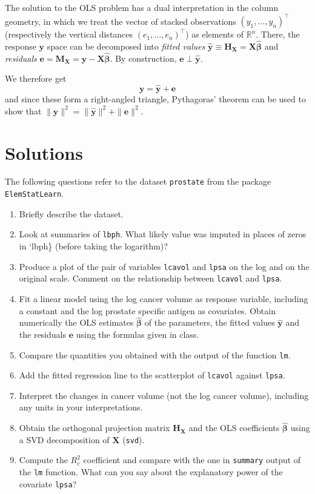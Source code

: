 \documentclass[]{book}
\providecommand{\tightlist}{%
  \setlength{\itemsep}{0pt}\setlength{\parskip}{0pt}}
\theoremstyle{definition}
\theoremstyle{definition}
\theoremstyle{definition}
\theoremstyle{remark}
\begin{document}
The solution to the OLS problem has a dual interpretation in the column
geometry, in which we treat the vector of stacked observations
\((y_1, \ldots, y_n)^\top\) (respectively the vertical distances
\((e_1, \ldots, e_n)^\top\)) as elements of \(\mathbb{R}^n\). There, the
response \(\boldsymbol{y}\) space can be decomposed into \emph{fitted
values}
\(\hat{{\boldsymbol{y}}} \equiv \mathbf{H}_{\mathbf{X}} = \mathbf{X}\hat{\boldsymbol{\beta}}\)
and \emph{residuals}
\(\boldsymbol{e} = \mathbf{M}_{\mathbf{X}} = \boldsymbol{y} - \mathbf{X}\hat{\boldsymbol{\beta}}\).
By construction, \(\boldsymbol{e} \perp \hat{{\boldsymbol{y}}}\).

We therefore get
\[\boldsymbol{y} = \hat{\boldsymbol{y}} + \boldsymbol{e}\] and since
these form a right-angled triangle, Pythagoras' theorem can be used to
show that
\(\|\boldsymbol{y}\|^2 = \|\hat{\boldsymbol{y}}\|^2 + \|\boldsymbol{e}\|^2.\)

\hypertarget{solutions-1}{%
\section{Solutions}\label{solutions-1}}

The following questions refer to the dataset \texttt{prostate} from the
package \texttt{ElemStatLearn}.

\begin{enumerate}
\def\labelenumi{\alph{enumi}.}
\tightlist
\item
  Briefly describe the dataset.
\item
  Look at summaries of \texttt{lbph}. What likely value was imputed in
  places of zeros in `lbph\} (before taking the logarithm)?
\item
  Produce a plot of the pair of variables \texttt{lcavol} and
  \texttt{lpsa} on the log and on the original scale. Comment on the
  relationship between \texttt{lcavol} and \texttt{lpsa}.
\item
  Fit a linear model using the log cancer volume as response variable,
  including a constant and the log prostate specific antigen as
  covariates. Obtain numerically the OLS estimates
  \(\hat{\boldsymbol{\beta}}\) of the parameters, the fitted values
  \(\hat{\boldsymbol{y}}\) and the residuals \(\boldsymbol{e}\) using
  the formulas given in class.
\item
  Compare the quantities you obtained with the output of the function
  \texttt{lm}.
\item
  Add the fitted regression line to the scatterplot of \texttt{lcavol}
  against \texttt{lpsa}.
\item
  Interpret the changes in cancer volume (not the log cancer volume),
  including any units in your interpretations.
\item
  Obtain the orthogonal projection matrix \(\mathbf{H}_\mathbf{X}\) and
  the OLS coefficients \(\hat{\boldsymbol{\beta}}\) using a SVD
  decomposition of \(\mathbf{X}\) (\texttt{svd}).
\item
  Compute the \(R^2_c\) coefficient and compare with the one in
  \texttt{summary} output of the \texttt{lm} function. What can you say
  about the explanatory power of the covariate \texttt{lpsa}?
\end{enumerate}
\end{document}
